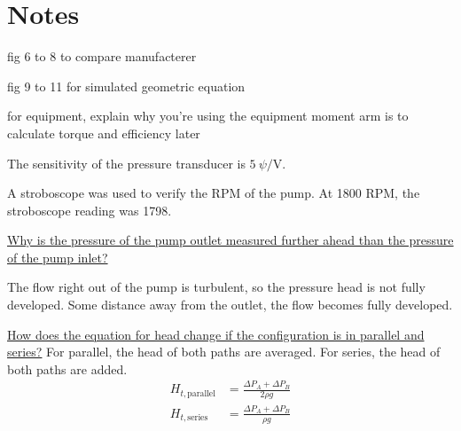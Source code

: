 \section{Notes}

fig 6 to 8 to compare manufacterer

fig 9 to 11 for simulated geometric equation

for equipment, explain why you're using the equipment
moment arm is to calculate torque and efficiency later

The sensitivity of the pressure transducer is $\qty{5}{\psi\per\volt}$.

A stroboscope was used to verify the RPM of the pump. At 1800 RPM, the stroboscope reading was 1798.

\underline{Why is the pressure of the pump outlet measured further ahead than the pressure of the pump inlet?}

The flow right out of the pump is turbulent, so the pressure head is not fully developed. Some distance away from the outlet, the flow becomes fully developed.

\underline{How does the equation for head change if the configuration is in parallel and series?}
For parallel, the head of both paths are averaged. For series, the head of both paths are added.
\begin{align*}
    H_{t, \text{parallel}} &= \frac{\Delta P_{A} + \Delta P_{B}}{2 \rho g} \\
    H_{t, \text{series}} &= \frac{\Delta P_{A} + \Delta P_{B}}{\rho g}
\end{align*}

